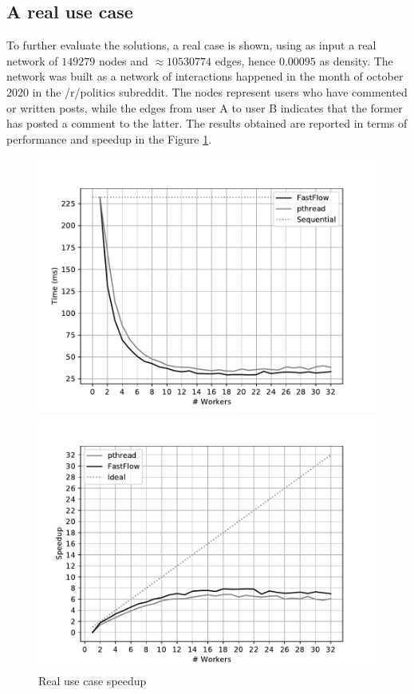 \subsection{A real use case}
To further evaluate the solutions, a real case is shown, using as
 input a real network of $149279$ nodes and $\approx 10530774$ edges, hence $0.00095$ as density. The 
 network was built as a network
  of interactions happened in the 
  month of october 
 2020 in the /r/politics subreddit. The nodes represent users who have 
 commented or written posts, while the edges from user 
 A to user B indicates that the former has posted a comment to the latter. 
 The results obtained are reported in terms of performance and speedup in 
 the Figure  \ref{fig:real-case}.

\begin{figure}[h]
\centering
\begin{minipage}{0.48\textwidth}
    \includegraphics[width=\textwidth]{plots/fastflow_performance_real_time.pdf}
\end{minipage}
\begin{minipage}{0.48\textwidth}
    \includegraphics[width=\textwidth]{plots/fastflow_speedup_real_time.pdf}
\end{minipage}
\caption{Real use case speedup}
\label{fig:real-case}
\end{figure}
